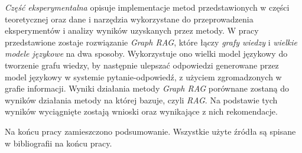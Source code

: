 \documentclass[
a4paper,
12pt,
]{article}
\begin{document}

\textit{Część eksperymentalna} opisuje implementacje metod przedstawionych w części teoretycznej oraz dane i narzędzia wykorzystane do przeprowadzenia eksperymentów i analizy  wyników uzyskanych przez metody. 
W pracy przedstawione zostaje rozwiązanie \textit{Graph RAG}, które łączy \textit{grafy wiedzy} i \textit{wielkie modele językowe} na dwa sposoby. 
Wykorzystuje ono wielki model językowy do tworzenie grafu wiedzy, by następnie ulepszać odpowiedzi generowane przez model językowy w systemie pytanie-odpowiedź, z użyciem zgromadzonych w grafie informacji.
Wyniki działania metody \textit{Graph RAG} porównane zostaną do wyników działania metody na której bazuje, czyli \textit{RAG}. Na podstawie tych wyników wyciągnięte zostają wnioski oraz wynikające z nich rekomendacje.





Na końcu pracy zamieszczono podsumowanie. Wszystkie użyte źródła są spisane w bibliografii na końcu pracy. 


\end{document}
